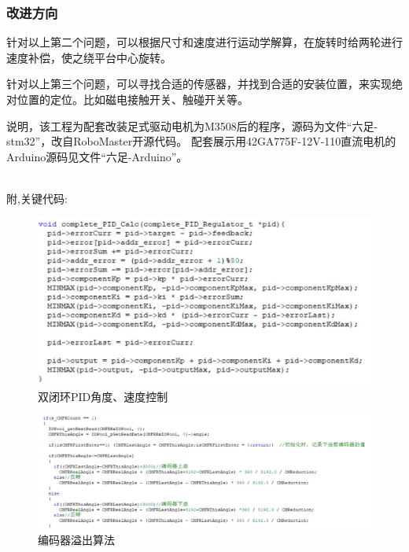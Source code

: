 \documentclass[12pt]{article}
\begin{document}
\begin{CJK}{UTF8}{gbsn}
\subsubsection{改进方向}
针对以上第二个问题，可以根据尺寸和速度进行运动学解算，在旋转时给两轮进行速度补偿，使之绕平台中心旋转。\par
针对以上第三个问题，可以寻找合适的传感器，并找到合适的安装位置，来实现绝对位置的定位。比如磁电接触开关、触碰开关等。\par
说明，该工程为配套改装足式驱动电机为M3508后的程序，源码为文件“六足-stm32”，改自RoboMaster开源代码。 配套展示用42GA775F-12V-110直流电机的Arduino源码见文件“六足-Arduino”。\par
~\\
附,关键代码:
 \begin{figure}[H]
\centering
\includegraphics[width=.9\textwidth]{chap5//fig7.jpg}
\caption{双闭环PID角度、速度控制}
\end{figure}
 \begin{figure}[H]
\centering
\includegraphics[width=.9\textwidth]{chap5//fig8.jpg}
\caption{编码器溢出算法}
\end{figure}


\end{CJK}
\end{document}

